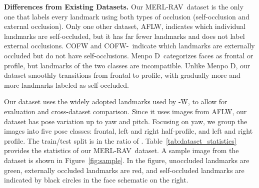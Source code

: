 \documentclass[10pt,twocolumn,letterpaper]{article}
\newcommand{\threehundredW}{-W}
\newcommand{\menpoTwoD}{Menpo D}
\newcommand{\cofwSixtyEight}{COFW-}
\newcommand{\ourdataset}{MERL-RAV}
\newcommand{\1}{{\bf 1}}
\newcommand{\0}{{\bf 0}}
\begin{document}
    
\textbf{Differences from Existing Datasets.}
    Our \ourdataset~dataset is the only one that labels every landmark using both types of occlusion (self-occlusion and external occlusion). Only one other dataset, AFLW, indicates which individual landmarks are self-occluded, but it has far fewer landmarks and does not label external occlusions. COFW and \cofwSixtyEight~indicate which landmarks are externally occluded but do not have self-occlusions. \menpoTwoD~categorizes faces as frontal or profile, but landmarks of the two classes are incompatible. Unlike \menpoTwoD, our dataset smoothly transitions from frontal to profile, with gradually more and more landmarks labeled as self-occluded.  
    
    Our dataset uses the widely adopted  landmarks used by \threehundredW, to allow for evaluation and cross-dataset comparison.  Since it uses images from AFLW, our dataset has pose variation up to  yaw and   pitch. Focusing on yaw, we group the images into five pose classes: frontal, left and right half-profile, and left and right profile. The train/test split is in the ratio of . Table~\ref{tab:dataset_statistics} provides the statistics of our \ourdataset~dataset. A sample image from the dataset is shown in Figure~\ref{fig:sample}. In the figure, unoccluded landmarks are green, externally occluded landmarks are red, and self-occluded landmarks are indicated by black circles in the face schematic on the right.
  
\end{document}
